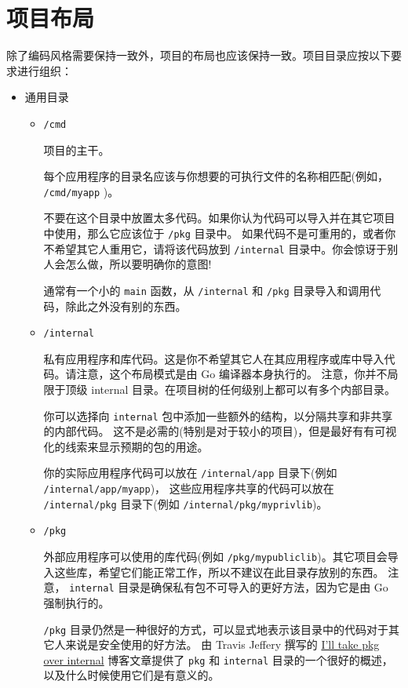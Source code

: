 \chapter{项目布局}
除了编码风格需要保持一致外，项目的布局也应该保持一致。项目目录应按以下要求进行组织：

\begin{itemize}[leftmargin=4em]
\item 通用目录

  \begin{itemize}
  \item \texttt{/cmd}

    项目的主干。

    每个应用程序的目录名应该与你想要的可执行文件的名称相匹配(例如， \texttt{/cmd/myapp} )。

    不要在这个目录中放置太多代码。如果你认为代码可以导入并在其它项目中使用，那么它应该位于 \texttt{/pkg} 目录中。
    如果代码不是可重用的，或者你不希望其它人重用它，请将该代码放到 \texttt{/internal} 目录中。你会惊讶于别人会怎么做，所以要明确你的意图!

    通常有一个小的 \texttt{main} 函数，从 \texttt{/internal} 和 \texttt{/pkg} 目录导入和调用代码，除此之外没有别的东西。

  \item \texttt{/internal}

    私有应用程序和库代码。这是你不希望其它人在其应用程序或库中导入代码。请注意，这个布局模式是由 Go 编译器本身执行的。
    注意，你并不局限于顶级 internal 目录。在项目树的任何级别上都可以有多个内部目录。

    你可以选择向 \texttt{internal} 包中添加一些额外的结构，以分隔共享和非共享的内部代码。
    这不是必需的(特别是对于较小的项目)，但是最好有有可视化的线索来显示预期的包的用途。

    你的实际应用程序代码可以放在 \texttt{/internal/app} 目录下(例如 \texttt{/internal/app/myapp})，
    这些应用程序共享的代码可以放在 \texttt{/internal/pkg} 目录下(例如 \texttt{/internal/pkg/myprivlib})。

  \item \texttt{/pkg}

    外部应用程序可以使用的库代码(例如 \texttt{/pkg/mypubliclib})。其它项目会导入这些库，希望它们能正常工作，所以不建议在此目录存放别的东西。
    注意， \texttt{internal} 目录是确保私有包不可导入的更好方法，因为它是由 Go 强制执行的。

    \texttt{/pkg} 目录仍然是一种很好的方式，可以显式地表示该目录中的代码对于其它人来说是安全使用的好方法。
    由 Travis Jeffery  撰写的 \href{https://travisjeffery.com/b/2019/11/i-ll-take-pkg-over-internal/}{I'll take pkg over internal} 博客文章提供了 \texttt{pkg} 和 \texttt{internal} 目录的一个很好的概述，以及什么时候使用它们是有意义的。


\end{itemize}
\end{itemize}
